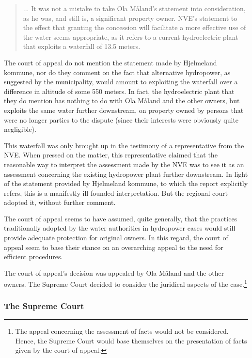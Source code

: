 \begin{quote}... It was not a mistake to take Ola Måland's statement into consideration, as he was, and still is, a significant property owner. NVE's statement to the effect that granting the concession will facilitate a more effective use of the water seems appropriate, as it refers to a current hydroelectric plant that exploits a waterfall of 13.5 meters.
\end{quote}

The court of appeal do not mention the statement made by Hjelmeland kommune, nor do they comment on the fact that alternative hydropower, as suggested by the municipality, would amount to exploiting the waterfall over a difference in altitude of some 550 meters. In fact, the hydroelectric plant that they do mention has nothing to do with Ola Måland and the other owners, but exploits the same water further downstream, on property owned by persons that were no longer parties to the dispute (since their interests were obviously quite negligible).

This waterfall was only brought up in the testimony of a representative from the NVE. When pressed on the matter, this representative claimed that the reasonable way to interpret the assessment made by the NVE was to see it as an assessment concerning the existing hydropower plant further downstream. In light of the statement provided by Hjelmeland kommune, to which the report explicitly refers, this is a manifestly ill-founded interpretation. But the regional court adopted it, without further comment.

The court of appeal seems to have assumed, quite generally, that the practices traditionally adopted by the water authorities in hydropower cases would still provide adequate protection for original owners. In this regard, the court of appeal seem to base their stance on an overarching appeal to the need for efficient procedures.

The court of appeal's decision was appealed by Ola Måland and the other owners. The Supreme Court decided to consider the juridical aspects of the case.\footnote{The appeal concerning the assessment of facts would not be considered. Hence, the Supreme Court would base themselves on the presentation of facts given by the court of appeal.}

\subsubsection{The Supreme Court}

